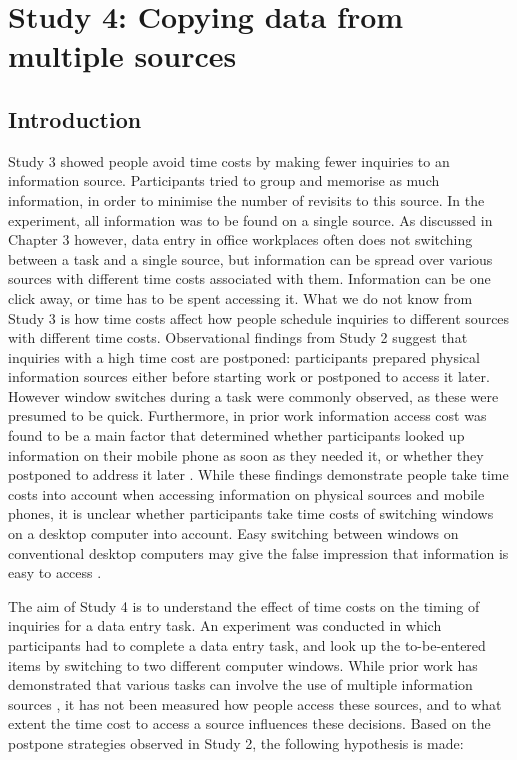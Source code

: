 
\section{Study 4: Copying data from multiple sources}
 
\subsection{Introduction}

Study 3 showed people avoid time costs by making fewer inquiries to an information source. Participants tried to group and memorise as much information, in order to minimise the number of revisits to this source. In the experiment, all information was to be found on a single source. As discussed in Chapter 3 however, data entry in office workplaces often does not switching between a task and a single source, but information can be spread over various sources with different time costs associated with them. Information can be one click away, or time has to be spent accessing it. What we do not know from Study 3 is how time costs affect how people schedule inquiries to different sources with different time costs. Observational findings from Study 2 suggest that inquiries with a high time cost are postponed: participants prepared physical information sources either before starting work or postponed to access it later. However window switches during a task were commonly observed, as these were presumed to be quick. Furthermore, in prior work information access cost was found to be a main factor that determined whether participants looked up information on their mobile phone as soon as they needed it, or whether they postponed to address it later \citep{Sohn2008}. While these findings demonstrate people take time costs into account when accessing information on physical sources and mobile phones, it is unclear whether participants take time costs of switching windows on a desktop computer into account. Easy switching between windows on conventional desktop computers may give the false impression that information is easy to access \citep{Sellen2003}. 

The aim of Study 4 is to understand the effect of time costs on the timing of inquiries for a data entry task. An experiment was conducted in which participants had to complete a data entry task, and look up the to-be-entered items by switching to two different computer windows. While prior work has demonstrated that various tasks can involve the use of multiple information sources \citep{Cangiano2009, Murphy2016, Su2013}, it has not been measured how people access these sources, and to what extent the time cost to access a source influences these decisions. Based on the postpone strategies observed in Study 2, the following hypothesis is made:

